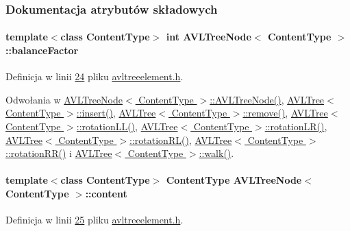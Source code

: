 \subsubsection{Dokumentacja atrybutów składowych}
\hypertarget{class_a_v_l_tree_node_a212c57dab467b42c3ddc50b2aecc05ad}{
\paragraph[{balance\-Factor}]{\setlength{\rightskip}{0pt plus 5cm}template$<$class Content\-Type$>$ int {\bf A\-V\-L\-Tree\-Node}$<$ Content\-Type $>$\-::balance\-Factor}}\label{class_a_v_l_tree_node_a212c57dab467b42c3ddc50b2aecc05ad}


Definicja w linii \hyperlink{avltreeelement_8h_source_l00024}{24} pliku \hyperlink{avltreeelement_8h_source}{avltreeelement.\-h}.



Odwołania w \hyperlink{avltreeelement_8h_source_l00027}{A\-V\-L\-Tree\-Node$<$ Content\-Type $>$\-::\-A\-V\-L\-Tree\-Node()}, \hyperlink{avltree_8h_source_l00040}{A\-V\-L\-Tree$<$ Content\-Type $>$\-::insert()}, \hyperlink{avltree_8h_source_l00271}{A\-V\-L\-Tree$<$ Content\-Type $>$\-::remove()}, \hyperlink{avltree_8h_source_l00151}{A\-V\-L\-Tree$<$ Content\-Type $>$\-::rotation\-L\-L()}, \hyperlink{avltree_8h_source_l00201}{A\-V\-L\-Tree$<$ Content\-Type $>$\-::rotation\-L\-R()}, \hyperlink{avltree_8h_source_l00177}{A\-V\-L\-Tree$<$ Content\-Type $>$\-::rotation\-R\-L()}, \hyperlink{avltree_8h_source_l00125}{A\-V\-L\-Tree$<$ Content\-Type $>$\-::rotation\-R\-R()} i \hyperlink{avltree_8h_source_l00370}{A\-V\-L\-Tree$<$ Content\-Type $>$\-::walk()}.

\hypertarget{class_a_v_l_tree_node_ac94089c8fd88ff9fbd092cd2306719bd}{
\paragraph[{content}]{\setlength{\rightskip}{0pt plus 5cm}template$<$class Content\-Type$>$ Content\-Type {\bf A\-V\-L\-Tree\-Node}$<$ Content\-Type $>$\-::content}}\label{class_a_v_l_tree_node_ac94089c8fd88ff9fbd092cd2306719bd}


Definicja w linii \hyperlink{avltreeelement_8h_source_l00025}{25} pliku \hyperlink{avltreeelement_8h_source}{avltreeelement.\-h}.

